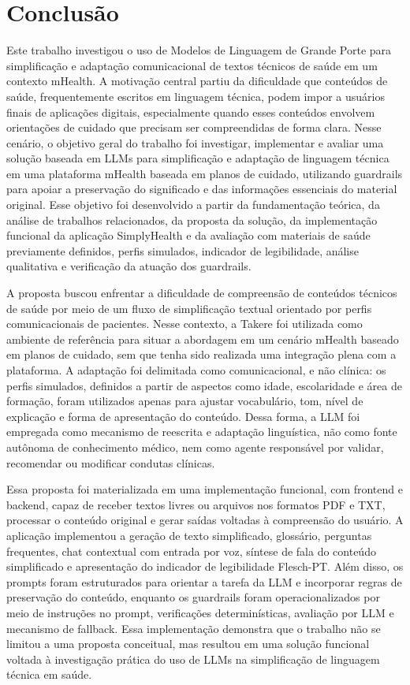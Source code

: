 \chapter{Conclusão}
\label{cap:conclusao}

Este trabalho investigou o uso de Modelos de Linguagem de Grande Porte para simplificação e adaptação comunicacional de textos técnicos de saúde em um contexto mHealth. A motivação central partiu da dificuldade que conteúdos de saúde, frequentemente escritos em linguagem técnica, podem impor a usuários finais de aplicações digitais, especialmente quando esses conteúdos envolvem orientações de cuidado que precisam ser compreendidas de forma clara. Nesse cenário, o objetivo geral do trabalho foi investigar, implementar e avaliar uma solução baseada em LLMs para simplificação e adaptação de linguagem técnica em uma plataforma mHealth baseada em planos de cuidado, utilizando guardrails para apoiar a preservação do significado e das informações essenciais do material original. Esse objetivo foi desenvolvido a partir da fundamentação teórica, da análise de trabalhos relacionados, da proposta da solução, da implementação funcional da aplicação SimplyHealth e da avaliação com materiais de saúde previamente definidos, perfis simulados, indicador de legibilidade, análise qualitativa e verificação da atuação dos guardrails.

A proposta buscou enfrentar a dificuldade de compreensão de conteúdos técnicos de saúde por meio de um fluxo de simplificação textual orientado por perfis comunicacionais de pacientes. Nesse contexto, a Takere foi utilizada como ambiente de referência para situar a abordagem em um cenário mHealth baseado em planos de cuidado, sem que tenha sido realizada uma integração plena com a plataforma. A adaptação foi delimitada como comunicacional, e não clínica: os perfis simulados, definidos a partir de aspectos como idade, escolaridade e área de formação, foram utilizados apenas para ajustar vocabulário, tom, nível de explicação e forma de apresentação do conteúdo. Dessa forma, a LLM foi empregada como mecanismo de reescrita e adaptação linguística, não como fonte autônoma de conhecimento médico, nem como agente responsável por validar, recomendar ou modificar condutas clínicas.

Essa proposta foi materializada em uma implementação funcional, com frontend e backend, capaz de receber textos livres ou arquivos nos formatos PDF e TXT, processar o conteúdo original e gerar saídas voltadas à compreensão do usuário. A aplicação implementou a geração de texto simplificado, glossário, perguntas frequentes, chat contextual com entrada por voz, síntese de fala do conteúdo simplificado e apresentação do indicador de legibilidade Flesch-PT. Além disso, os prompts foram estruturados para orientar a tarefa da LLM e incorporar regras de preservação do conteúdo, enquanto os guardrails foram operacionalizados por meio de instruções no prompt, verificações determinísticas, avaliação por LLM e mecanismo de fallback. Essa implementação demonstra que o trabalho não se limitou a uma proposta conceitual, mas resultou em uma solução funcional voltada à investigação prática do uso de LLMs na simplificação de linguagem técnica em saúde.

